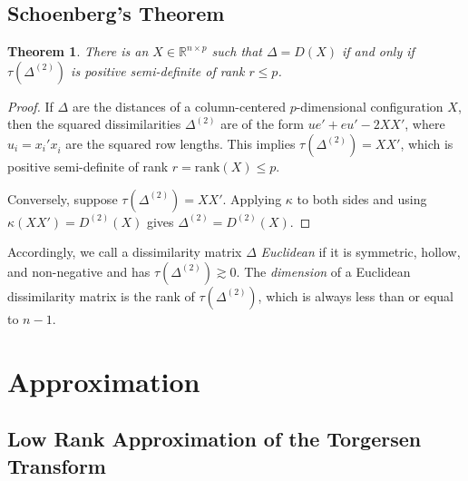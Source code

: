 \documentclass[
  12pt,
]{book}
\newtheorem{theorem}{Theorem}[chapter]
\theoremstyle{definition}
\theoremstyle{definition}
\theoremstyle{definition}
\theoremstyle{definition}
\theoremstyle{remark}
\begin{document}
\hypertarget{schoenbergs-theorem}{%
\subsection{Schoenberg's Theorem}\label{schoenbergs-theorem}}

\begin{theorem}
\protect\hypertarget{thm:schoenberg}{}\label{thm:schoenberg}There is an \(X\in\mathbb{R}^{n\times p}\) such that \(\Delta=D(X)\) if and
only if \(\tau(\Delta^{(2)})\) is positive semi-definite of rank
\(r\leq p\).
\end{theorem}

\begin{proof}
If \(\Delta\) are the distances of a column-centered \(p\)-dimensional
configuration \(X\), then the squared dissimilarities \(\Delta^{(2)}\)
are of the form \(ue'+eu'-2XX'\), where \(u_i=x_i'x_i^{\ }\) are the squared
row lengths. This implies \(\tau(\Delta^{(2)})=XX'\), which is
positive semi-definite of rank \(r=\text{rank}(X)\leq p\).

Conversely, suppose \(\tau(\Delta^{(2)})=XX'\). Applying \(\kappa\) to both sides and using \(\kappa(XX')=D^{(2)}(X)\) gives \(\Delta^{(2)}=D^{(2)}(X)\).
\end{proof}

Accordingly, we call a dissimilarity matrix \(\Delta\) \emph{Euclidean} if it is symmetric, hollow, and non-negative and has \(\tau(\Delta^{(2)})\gtrsim 0\). The \emph{dimension} of a Euclidean dissimilarity matrix is the rank of \(\tau(\Delta^{(2)})\), which is always less than or equal to \(n-1\).

\hypertarget{approximation}{%
\section{Approximation}\label{approximation}}

\hypertarget{low-rank-approximation-of-the-torgersen-transform}{%
\subsection{Low Rank Approximation of the Torgersen Transform}\label{low-rank-approximation-of-the-torgersen-transform}}
\end{document}
